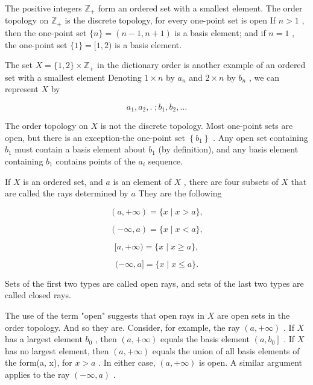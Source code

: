 \begin{example} The positive integers \({\mathbb{Z}}_{ + }\) form an ordered set with a smallest element. The order topology on \({\mathbb{Z}}_{ + }\) is the discrete topology, for every one-point set is open If \(n > 1\) , then the one-point set \(\{ n\}  = \left( {n - 1,n + 1}\right)\) is a basis element; and if \(n = 1\) , the one-point set \(\{ 1\}  = \lbrack 1,2)\) is a basis element.
\end{example}

\begin{example} The set \(X = \{ 1,2\}  \times  {\mathbb{Z}}_{ + }\) in the dictionary order is another example of an ordered set with a smallest element Denoting \(1 \times  n\) by \({a}_{n}\) and \(2 \times  n\) by \({b}_{n}\) , we can represent \(X\) by

\[
{a}_{1},{a}_{2},.\;;{b}_{1},{b}_{2},\ldots
\]

The order topology on \(X\) is not the discrete topology. Most one-point sets are open, but there is an exception-the one-point set \(\left\{  {b}_{1}\right\}\) . Any open set containing \({b}_{1}\) must contain a basis element about \({b}_{1}\) (by definition), and any basis element containing \({b}_{1}\) contains points of the \({a}_{i}\) sequence.
\end{example}

\begin{definition} If \(X\) is an ordered set, and \(a\) is an element of \(X\) , there are four subsets of \(X\) that are called the rays determined by \(a\) They are the following

\[
\left( {a, + \infty }\right)  = \{ x \mid  x > a\} ,
\]

\[
\left( {-\infty ,a}\right)  = \{ x \mid  x < a\} ,
\]

\[
\lbrack a, + \infty ) = \{ x \mid  x \geq  a\} ,
\]

\[
( - \infty ,a\rbrack  = \{ x \mid  x \leq  a\} .
\]

Sets of the first two types are called open rays, and sets of the last two types are called closed rays.
\end{definition}

The use of the term "open" suggests that open rays in \(X\) are open sets in the order topology. And so they are. Consider, for example, the ray \(\left( {a, + \infty }\right)\) . If \(X\) has a largest element \({b}_{0}\) , then \(\left( {a, + \infty }\right)\) equals the basis element \(\left( {a,{b}_{0}}\right\rbrack\) . If \(X\) has no largest element, then \(\left( {a, + \infty }\right)\) equals the union of all basis elements of the form(a, x), for \(x > a\) . In either case, \(\left( {a, + \infty }\right)\) is open. A similar argument applies to the ray \(\left( {-\infty ,a}\right)\) .

